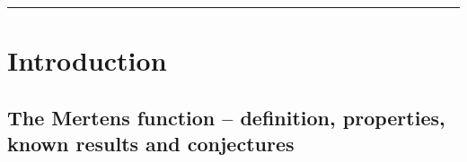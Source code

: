 \documentclass[11pt,reqno,a4letter]{article}
\numberwithin{figure}{section}
\numberwithin{table}{section}
\theoremstyle{plain}
\numberwithin{theorem}{section}
\theoremstyle{definition}
\begin{document}
\bigskip\hrule\bigskip

\newpage
\section{Introduction} 

\subsection{The Mertens function -- definition, properties, known results and conjectures} 
\label{subSection_MertensMxClassical_Intro} 
\end{document}
